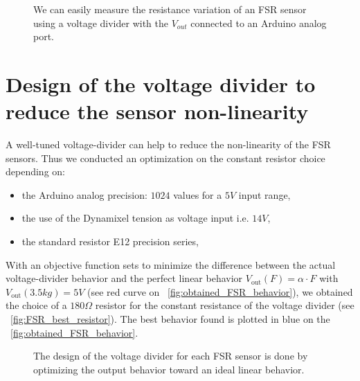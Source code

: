 \begin{figure}[!ht]
\centering
    \hfil
    \caption{We can easily measure the resistance variation of an FSR sensor using a voltage divider with the $V_{out}$ connected to an Arduino analog port.}
    \label{fig:test_sensors}
\end{figure}

\section{Design of the voltage divider to reduce the sensor non-linearity} %

A well-tuned voltage-divider can help to reduce the non-linearity of the FSR sensors. Thus we conducted an optimization on the constant resistor choice depending on:
\begin{itemize}
    \item the Arduino analog precision: $1024$ values for a $5V$ input range,
    \item the use of the Dynamixel tension as voltage input i.e. $14V$,
    \item the standard resistor E12 precision series,
\end{itemize}

With an objective function sets to minimize the difference between the actual voltage-divider behavior and the perfect linear behavior $V_\mathrm{out}(F) = \alpha \cdot F$ with $V_\mathrm{out}(3.5kg) = 5V$ (see red curve on \figurename~\ref{fig:obtained_FSR_behavior}), we obtained the choice of a $180\Omega$ resistor for the constant resistance of the voltage divider (see \figurename~\ref{fig:FSR_best_resistor}). The best behavior found is plotted in blue on the \figurename~\ref{fig:obtained_FSR_behavior}.

\begin{figure}[ht]
\centering
    \hfil
    \caption{The design of the voltage divider for each FSR sensor is done by optimizing the output behavior toward an ideal linear behavior.}
    \label{fig:foot_sensor_behavior}
\end{figure}
